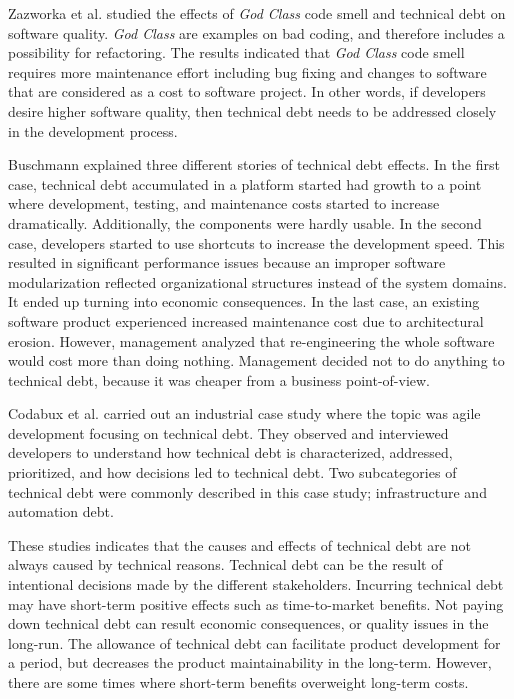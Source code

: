 Zazworka et al.\cite{zazworka2011investigating} studied the effects of \textit{God Class} code smell and technical debt on software quality. \textit{God Class} are examples on bad coding, and therefore includes a possibility for refactoring\cite{Zazworka:2011:PDD:1985362.1985372}. The results indicated that \textit{God Class} code smell requires more maintenance effort including bug fixing and changes to software that are considered as a cost to software project. In other words, if developers desire higher software quality, then technical debt needs to be addressed closely in the development process.

Buschmann\cite{buschmann2011pay} explained three different stories of technical debt effects. In the first case, technical debt accumulated in a platform started had growth to a point where development, testing, and maintenance costs started to increase dramatically. Additionally, the components were hardly usable. In the second case, developers started to use shortcuts to increase the development speed. This resulted in significant performance issues because an improper software modularization reflected organizational structures instead of the system domains. It ended up turning into economic consequences. In the last case, an existing software product experienced increased maintenance cost due to architectural erosion. However, management analyzed that re-engineering the whole software would cost more than doing nothing. Management decided not to do anything to technical debt, because it was cheaper from a business point-of-view.

Codabux et al.\cite{p8-codabux} carried out an industrial case study where the topic was agile development focusing on technical debt. They observed and interviewed developers to understand how technical debt is characterized, addressed, prioritized, and how decisions led to technical debt. Two subcategories of technical debt were commonly described in this case study; infrastructure and automation debt. 

These studies indicates that the causes and effects of technical debt are not always caused by technical reasons. Technical debt can be the result of intentional decisions made by the different stakeholders. Incurring technical debt may have short-term positive effects such as time-to-market benefits. Not paying down technical debt can result economic consequences, or quality issues in the long-run. The allowance of technical debt can facilitate product development for a period, but decreases the product maintainability in the long-term. However, there are some times where short-term benefits overweight long-term costs\cite{guo2011tracking}. 


